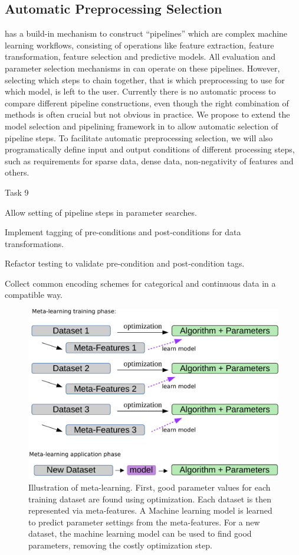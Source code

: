 \subsection{Automatic Preprocessing Selection}
\sklearn{} has a build-in mechanism to construct ``pipelines'' which are complex 
machine learning workflows, consisting of operations like feature extraction,
feature transformation, feature selection and predictive models.
All evaluation and parameter selection mechanisms in \sklearn{} can operate
on these pipelines.
However, selecting which steps to chain together, that is which preprocessing
to use for which model, is left to the user. Currently there is no
automatic process to compare different pipeline constructions, even though
the right combination of methods is often crucial but not obvious in practice.
We propose to extend the model selection and pipelining framework in \sklearn{}
to allow automatic selection of pipeline steps.
To facilitate automatic preprocessing selection, we will also programatically
define input and output conditions of different processing steps, such
as requirements for sparse data, dense data, non-negativity of features and others.
\begin{labeling}{Task 9}
    \item [Task 6] Allow setting of pipeline steps in \sklearn{} parameter searches.
    \item [Task 7] Implement tagging of pre-conditions and post-conditions for data transformations.
    \item [Task 8] Refactor \sklearn{} testing to validate pre-condition and post-condition tags.
    \item [Task 9] Collect common encoding schemes for categorical and
        continuous data in a \sklearn{} compatible way.
\end{labeling}

\begin{figure}
    \begin{center}
    \includegraphics[width=.5\linewidth]{meta-learning-diagram.pdf}
    \end{center}
    \caption{Illustration of meta-learning. First, good parameter values for
        each training dataset are found using optimization. Each dataset is
        then represented via meta-features. A Machine learning model is learned
        to predict parameter settings from the meta-features. For a new
        dataset, the machine learning model can be used to find good
    parameters, removing the costly optimization step.}
    \label{meta-learning}
\end{figure}

